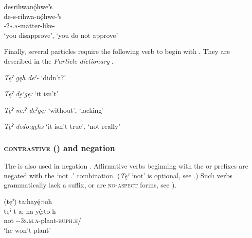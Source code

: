 \ex desrihwanǫ́hweˀs\\
\gll de-s-rihwa-nǫ́hwe-ˀs\\
{\negative}-\textsc{2s.a}-matter-like-{\habitual}\\
\glt  ‘you disapprove’, `you do not approve'
\z
\z

\largerpage
Finally, several particles require the following verb to begin with  {\negative}. They are described in the \textit{Particle dictionary} .

\begin{CayugaRelated}
\item{}\textit{Tęˀ gęh deˀ-} ‘didn't?’\\
\item{}\textit{Tęˀ de̱ˀgę:} ‘it isn't’\\
\item{}\textit{Tęˀ ne:ˀ de̱ˀgę:} ‘without’, ‘lacking’\\
\item{}\textit{Tęˀ dedo:gęhs} ‘it isn't true’, ‘not really’
\end{CayugaRelated}

\subsubsection*{ \textsc{contrastive} ({\contrastive}) and negation} \label{[ti-] contrastive and negation}
The  {\contrastive} is also used in negation . Affirmative verbs beginning with the  {\indefinite} or  {\future} prefixes are negated with the  ‘not \textsc{\contrastive.\indefinite}’ combination. (\textit{Tęˀ} ‘not’ is optional, see .) Such verbs grammatically lack a  {\punctual} suffix, or are \textsc{no-aspect} forms, see ).

\ea\label{ex:tireq3}

(tęˀ) ta:hayę́:toh\\
\gll tęˀ t-a:-ha-yę́:to-h\\
not {\contrastive}-{\indefinite}-\textsc{3s.m.a}-plant-\textsc{euph.h}/{\noaspect}\\
\glt `he won’t plant'
\z



